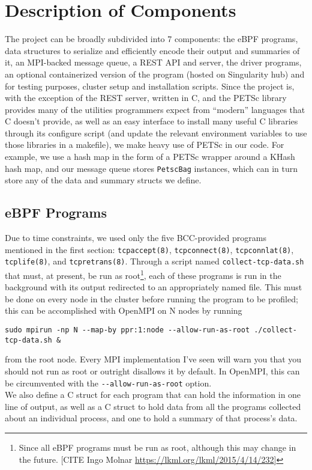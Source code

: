 \documentclass[11pt]{article}
\begin{document}
\section{Description of Components}

The project can be broadly subdivided into 7 components: the eBPF programs, data structures to serialize and efficiently encode their output and summaries of it, an MPI-backed message queue, a REST API and server, the driver programs, an optional containerized version of the program (hosted on Singularity hub) and for testing purposes, cluster setup and installation scripts. Since the project is, with the exception of the REST server, written in C, and the PETSc library provides many of the utilities programmers expect from ``modern'' languages that C doesn't provide, as well as an easy interface to install many useful C libraries through its configure script (and update the relevant environment variables to use those libraries in a makefile), we make heavy use of PETSc in our code. For example, we use a hash map in the form of a PETSc wrapper around a KHash hash map, and our message queue stores \lstinline{PetscBag} instances, which can in turn store any of the data and summary structs we define.
\subsection*{eBPF Programs}
Due to time constraints, we used only the five BCC-provided programs mentioned in the first section: \lstinline{tcpaccept(8)}, \lstinline{tcpconnect(8)}, \lstinline{tcpconnlat(8)}, \lstinline{tcplife(8)}, and \lstinline{tcpretrans(8)}. Through a script named \lstinline{collect-tcp-data.sh} that must, at present, be run as root\footnote{Since all eBPF programs must be run as root, although this may change in the future. [CITE Ingo Molnar \url{https://lkml.org/lkml/2015/4/14/232}]}, each of these programs is run in the background with its output redirected to an appropriately named file. This must be done on every node in the cluster before running the program to be profiled; this can be accomplished with OpenMPI on N nodes by running
\begin{Verbatim}
sudo mpirun -np N --map-by ppr:1:node --allow-run-as-root ./collect-tcp-data.sh &
\end{Verbatim}
from the root node. Every MPI implementation I've seen will warn you that you should not run as root or outright disallows it by default. In OpenMPI, this can be circumvented with the \lstinline{--allow-run-as-root} option. \\
We also define a C struct for each program that can hold the information in one line of output, as well as a C struct to hold data from all the programs collected about an individual process, and one to hold a summary of that process's data.
\end{document}
